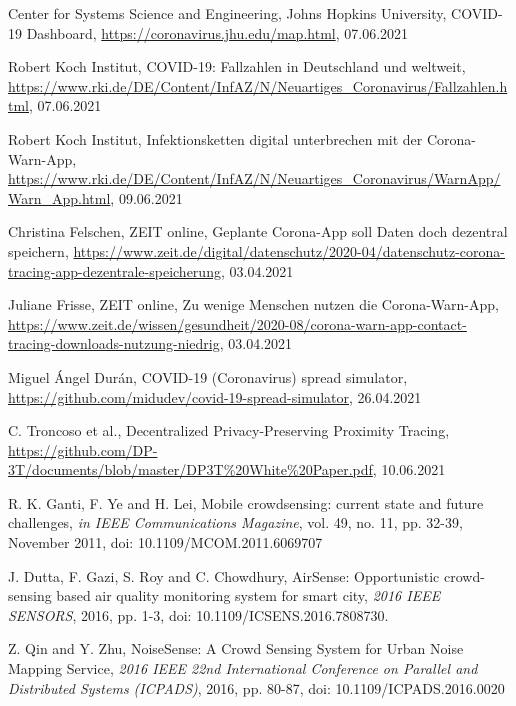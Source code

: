 \documentclass[conference,compsoc]{IEEEtran}
\begin{document}
\begin{thebibliography}{00}
 Center for Systems Science and Engineering, Johns Hopkins University, \glqq COVID-19 Dashboard\grqq, \url{https://coronavirus.jhu.edu/map.html}, 07.06.2021

 Robert Koch Institut, \glqq COVID-19: Fallzahlen in Deutschland und weltweit\grqq,\\ \url{https://www.rki.de/DE/Content/InfAZ/N/Neuartiges_Coronavirus/Fallzahlen.html}, 07.06.2021

Robert Koch Institut, \glqq Infektionsketten digital unterbrechen mit der Corona-Warn-App\grqq,\\ \url{ https://www.rki.de/DE/Content/InfAZ/N/Neuartiges_Coronavirus/WarnApp/Warn_App.html}, 09.06.2021

 Christina Felschen, ZEIT online, \glqq Geplante Corona-App soll Daten doch dezentral speichern\grqq, \url{ https://www.zeit.de/digital/datenschutz/2020-04/datenschutz-corona-tracing-app-dezentrale-speicherung}, 03.04.2021

 Juliane Frisse, ZEIT online, \glqq Zu wenige Menschen nutzen die Corona-Warn-App\grqq, \url{https://www.zeit.de/wissen/gesundheit/2020-08/corona-warn-app-contact-tracing-downloads-nutzung-niedrig}, 03.04.2021

 Miguel Ángel Durán, \glqq COVID-19 (Coronavirus) spread simulator\grqq, \url{https://github.com/midudev/covid-19-spread-simulator}, 26.04.2021

 C. Troncoso et al., \glqq Decentralized Privacy-Preserving Proximity Tracing\grqq, \url{https://github.com/DP-3T/documents/blob/master/DP3T%20White%20Paper.pdf}, 10.06.2021

 R. K. Ganti, F. Ye and H. Lei, \glqq Mobile crowdsensing: current state and future challenges\grqq,\textit{ in IEEE Communications Magazine}, vol. 49, no. 11, pp. 32-39, November 2011, doi: 10.1109/MCOM.2011.6069707

 J. Dutta, F. Gazi, S. Roy and C. Chowdhury, \glqq AirSense: Opportunistic crowd-sensing based air quality monitoring system for smart city\grqq, \textit{ 2016 IEEE SENSORS}, 2016, pp. 1-3, doi: 10.1109/ICSENS.2016.7808730.

 Z. Qin and Y. Zhu, \glqq NoiseSense: A Crowd Sensing System for Urban Noise Mapping Service\grqq, \textit{2016 IEEE 22nd International Conference on Parallel and Distributed Systems (ICPADS)}, 2016, pp. 80-87, doi: 10.1109/ICPADS.2016.0020


\end{thebibliography}
\end{document}

